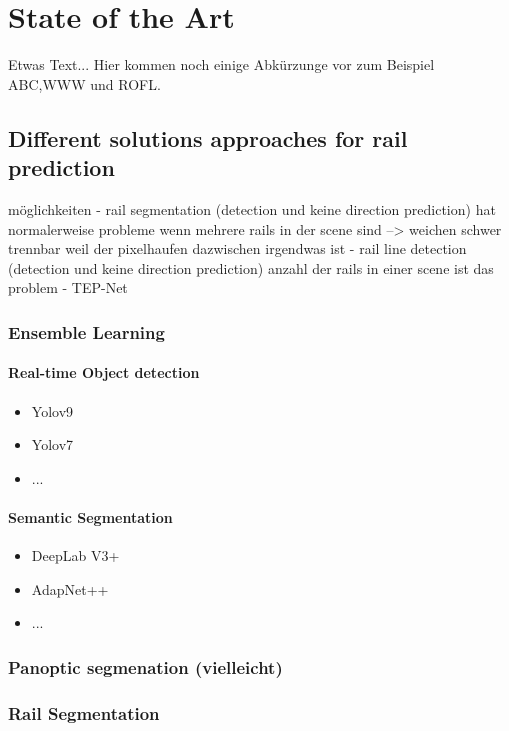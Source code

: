 \chapter{State of the Art}
Etwas Text... Hier kommen noch einige Abkürzunge vor zum Beispiel \ac{ABC},\ac{WWW} und \ac{ROFL}.

\section{Different solutions approaches for rail prediction}

möglichkeiten
- rail segmentation    (detection und keine direction prediction) hat normalerweise probleme wenn mehrere rails in der scene sind --> weichen schwer trennbar weil der pixelhaufen dazwischen irgendwas ist
- rail line detection  (detection und keine direction prediction) anzahl der rails in einer scene ist das problem
- TEP-Net


\subsection{Ensemble Learning}
\subsubsection{Real-time Object detection}

\begin{itemize}
    \item Yolov9
    \item Yolov7
    \item ...
\end{itemize}

\subsubsection{Semantic Segmentation}

\begin{itemize}
    \item DeepLab V3+
    \item AdapNet++
    \item ...
\end{itemize}

\subsection{Panoptic segmenation (vielleicht)}
\subsection{Rail Segmentation}

